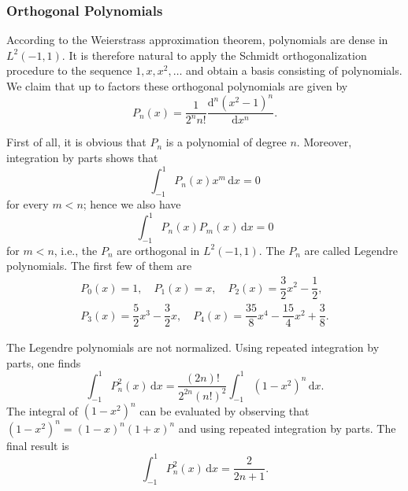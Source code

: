 \subsubsection{Orthogonal Polynomials}\label{subsec:orthogonal-polynomials}

According to the Weierstrass approximation theorem, polynomials are dense in $L^2(-1,1)$. It is therefore natural to apply the Schmidt orthogonalization procedure to the sequence $1,x,x^2,\ldots$ and obtain a basis consisting of polynomials. We claim that up to factors these orthogonal polynomials are given by
\begin{equation}\label{eq:legendre-polynomial-rodrigues-formula}
P_n(x)=\dfrac1{2^nn!}\dfrac{\mathrm{d}^n(x^2-1)^n}{\mathrm{d}x^n}.
\end{equation}


First of all, it is obvious that $P_n$ is a polynomial of degree $n$. Moreover, integration by parts shows that
\begin{equation}\label{eq:legendre-lower-monomial-orthogonality}
\int_{-1}^1 P_n(x)x^m\,\mathrm{d}x=0
\end{equation}
for every $m<n$; hence we also have
\begin{equation}\label{eq:legendre-polynomial-pairwise-orthogonality}
\int_{-1}^1 P_n(x)P_m(x)\,\mathrm{d}x=0
\end{equation}
for $m<n$, i.e., the $P_n$ are orthogonal in $L^2(-1,1)$. The $P_n$ are called Legendre polynomials. The first few of them are
\begin{equation}\label{eq:first-five-legendre-polynomials}
\begin{gathered}
P_0(x)=1,\quad P_1(x)=x,\quad P_2(x)=\dfrac32x^2-\dfrac12,\\
P_3(x)=\dfrac52x^3-\dfrac32x,\quad P_4(x)=\dfrac{35}8x^4-\dfrac{15}4x^2+\dfrac38.
\end{gathered}
\end{equation}


The Legendre polynomials are not normalized. Using repeated integration by parts, one finds
\begin{equation}\label{eq:legendre-square-integral-reduction}
\int_{-1}^1 P_n^2(x)\,\mathrm{d}x=\dfrac{(2n)!}{2^{2n}(n!)^2}\int_{-1}^1(1-x^2)^n\,\mathrm{d}x.
\end{equation}
The integral of $(1-x^2)^n$ can be evaluated by observing that $(1-x^2)^n=(1-x)^n(1+x)^n$ and using repeated integration by parts. The final result is
\begin{equation}\label{eq:legendre-square-integral-value}
\int_{-1}^1 P_n^2(x)\,\mathrm{d}x=\dfrac2{2n+1}.
\end{equation}


